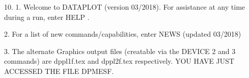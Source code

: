 10.
1. Welcome to DATAPLOT (version 03/2018).  For assistance at
   any time during a run, enter HELP   .

2. For a list of new commands/capabilities,
   enter NEWS  (updated 03/2018)

3. The alternate Graphics output files (creatable
   via the DEVICE 2 and 3 commands) are
   dppl1f.tex and dppl2f.tex respectively.
YOU HAVE JUST ACCESSED THE FILE DPMESF.
